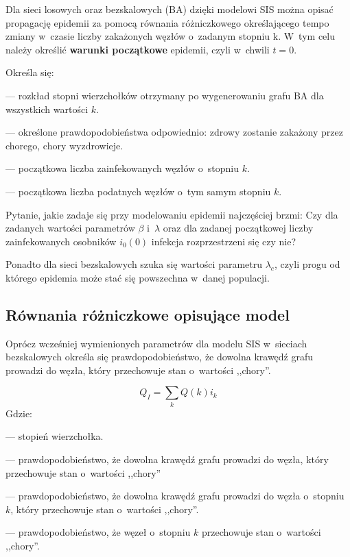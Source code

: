 Dla sieci losowych oraz bezskalowych (BA) dzięki modelowi SIS można opisać propagację epidemii za pomocą równania różniczkowego określającego tempo zmiany w~czasie liczby zakażonych węzłów o~zadanym stopniu k. W~tym celu należy określić \textbf{warunki początkowe} epidemii, czyli w~chwili $t = 0$. 

Określa się:
\begin{description} \itemsep0pt
\item[P(k)] --- rozkład stopni wierzchołków otrzymany po wygenerowaniu grafu BA dla wszystkich wartości $k$.
\item[$\pmb{\beta, \gamma}$] --- określone prawdopodobieństwa odpowiednio: zdrowy zostanie zakażony przez chorego, chory wyzdrowieje.
\item[$\pmb{I_k(0)}$] --- początkowa liczba zainfekowanych węzłów o~stopniu $k$.
\item[$\pmb{S_k(0)}$] --- początkowa liczba podatnych węzłów o~tym samym stopniu $k$.
\end{description}

Pytanie, jakie zadaje się przy modelowaniu epidemii najczęściej brzmi: Czy dla zadanych wartości parametrów $\beta$ i~$\lambda$ oraz dla zadanej początkowej liczby zainfekowanych osobników $i_0(0)$ infekcja rozprzestrzeni się czy nie?

Ponadto dla sieci bezskalowych szuka się wartości parametru $\lambda_c$, czyli progu od którego epidemia może stać się powszechna w~danej populacji.

\subsection{Równania różniczkowe opisujące model}
\label{subsec:rownania_rozniczkowe_opisujace_model}

Oprócz wcześniej wymienionych parametrów dla modelu SIS w~sieciach bezskalowych określa się prawdopodobieństwo, że dowolna krawędź grafu prowadzi do węzła, który przechowuje stan o~wartości ,,chory''.

\begin{equation}
\label{eq:q_i}
Q_I = \sum_{k} Q(k) i_k
\end{equation}
Gdzie:
\begin{description} \itemsep0pt
\item[k] --- stopień wierzchołka.
\item[$\pmb{Q_I}$] --- prawdopodobieństwo, że dowolna krawędź grafu prowadzi do węzła, który przechowuje stan o~wartości ,,chory''
\item[$\pmb{Q(k)}$] --- prawdopodobieństwo, że dowolna krawędź grafu prowadzi do węzła o~stopniu $k$, który przechowuje stan o~wartości ,,chory''.
\item[$\pmb{i_k}$] --- prawdopodobieństwo, że węzeł o~stopniu $k$ przechowuje stan o~wartości ,,chory''.
\end{description}

